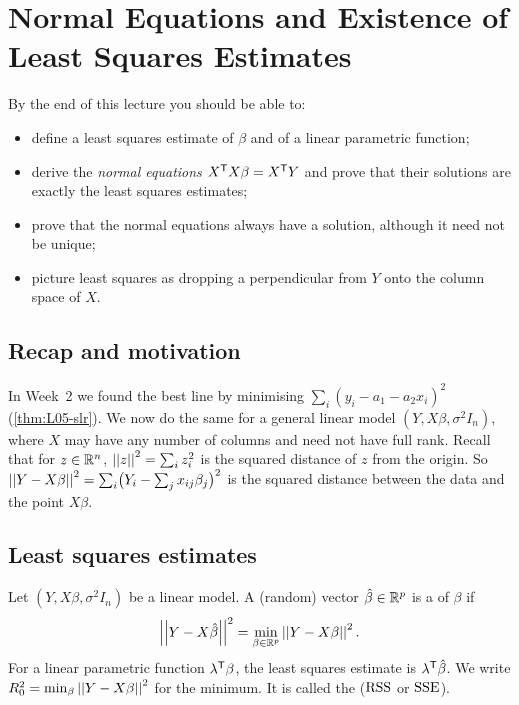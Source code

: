 \section{Normal Equations and Existence of Least Squares Estimates}\label{sec:L12}


\begin{guiding*}
By the end of this lecture you should be able to:
\begin{itemize}
  \item define a least squares estimate of $\beta$ and of a linear parametric function;
  \item derive the \emph{normal equations} $X^{\mathsf T} X\beta=X^{\mathsf T} Y$ and prove that their solutions are exactly the least squares estimates;
  \item prove that the normal equations always have a solution, although it need not be unique;
  \item picture least squares as dropping a perpendicular from $Y$ onto the column space of $X$.
\end{itemize}
\end{guiding*}

\subsection{Recap and motivation}
In Week~2 we found the best line by minimising $\sum_i(y_i-a_1-a_2x_i)^2$
(\cref{thm:L05-slr}). We now do the same for a general linear model $(Y,X\beta,\sigma^2I_n)$, where
$X$ may have any number of columns and need not have full rank. Recall that for $z\in\mathbb R^n$,
$\left|\left|z\right|\right|^2=\sum_i z_i^2$ is the squared distance of $z$ from the origin. So
$\left|\left|Y-X\beta\right|\right|^2=\sum_i\bigl(Y_i-\sum_j x_{ij}\beta_j\bigr)^2$ is the squared distance between the data and
the point $X\beta$.

\subsection{Least squares estimates}
\begin{definition}\label{def:L12-lse}
Let $(Y,X\beta,\sigma^2I_n)$ be a linear model. A (random) vector $\hat\beta\in\mathbb R^p$ is a
 of $\beta$ if
\[
\left|\left|Y-X\hat\beta\right|\right|^2=\min_{\beta\in\mathbb R^p}\left|\left|Y-X\beta\right|\right|^2 .
\]
For a linear parametric function $\lambda^{\mathsf T}\beta$, the least squares estimate is $\lambda^{\mathsf T}\hat\beta$.
We write $R_0^2=\min_\beta\left|\left|Y-X\beta\right|\right|^2$ for the minimum. It is called the  ($\mathrm{RSS}$ or $\mathrm{SSE}$).
\end{definition}

